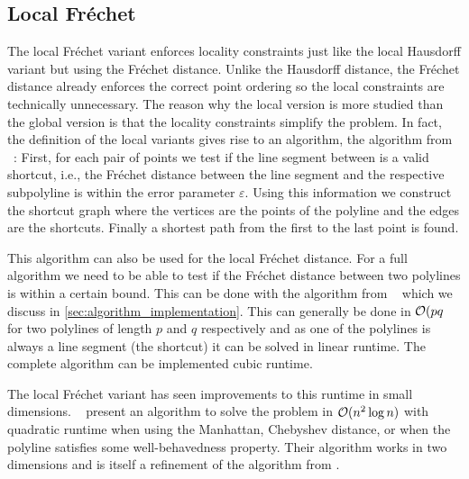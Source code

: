 \subsection{Local Fréchet}
The local Fréchet variant enforces locality constraints just like the local Hausdorff variant but using the Fréchet distance. Unlike the Hausdorff distance, the Fréchet distance already enforces the correct point ordering so the local constraints are technically unnecessary. The reason why the local version is more studied than the global version is that the locality constraints simplify the problem. In fact, the definition of the local variants gives rise to an algorithm, the algorithm from \citeauthor{computational_geometric_methods_for_polygonal_approximations_of_a_curve}~\cite{computational_geometric_methods_for_polygonal_approximations_of_a_curve}: First, for each pair of points we test if the line segment between is a valid shortcut, i.e., the Fréchet distance between the line segment and the respective subpolyline is within the error parameter \(\varepsilon\). Using this information we construct the shortcut graph where the vertices are the points of the polyline and the edges are the shortcuts. Finally a shortest path from the first to the last point is found.

This algorithm can also be used for the local Fréchet distance. For a full algorithm we need to be able to test if the Fréchet distance between two polylines is within a certain bound. This can be done with the algorithm from \citeauthor{computing_the_frechet_distance_between_two_polygonal_curves}~\cite{computing_the_frechet_distance_between_two_polygonal_curves} which we discuss in \cref{sec:algorithm_implementation}. This can generally be done in \(\mathcal{O}(pq\) for two polylines of length \(p\) and \(q\) respectively and as one of the polylines is always a line segment (the shortcut) it can be solved in linear runtime. The complete algorithm can be implemented cubic runtime.

The local Fréchet variant has seen improvements to this runtime in small dimensions. \citeauthor{polyline_simplification_under_the_local_frechet_distance_has_almost_quadratic_runtime_in_2d_storandtetal}~\cite{polyline_simplification_under_the_local_frechet_distance_has_almost_quadratic_runtime_in_2d_storandtetal} present an algorithm to solve the problem in \(\mathcal{O}(n^2\log n)\) with quadratic runtime when using the Manhattan, Chebyshev distance, or when the polyline satisfies some well-behavedness property. Their algorithm works in two dimensions and is itself a refinement of the algorithm from \citeauthor{computing_the_frechet_distance_between_two_polygonal_curves}.

